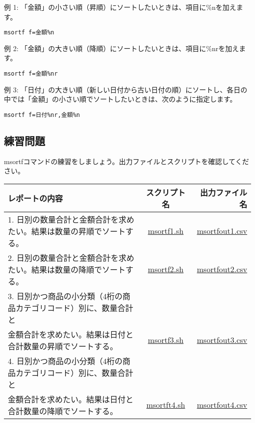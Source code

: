 例 1: 「金額」の小さい順（昇順）にソートしたいときは、項目に\%nを加えます。
\begin{verbatim}
msortf f=金額%n
\end{verbatim}

例 2: 「金額」の大きい順（降順）にソートしたいときは、項目に\%nrを加えます。
\begin{verbatim}
msortf f=金額%nr
\end{verbatim}

例 3: 「日付」の大きい順（新しい日付から古い日付の順）にソートし、各日の中では「金額」の小さい順でソートしたいときは、次のように指定します。
\begin{verbatim}
msortf f=日付%nr,金額%n
\end{verbatim}

\newpage

\subsection{練習問題}

msortfコマンドの練習をしましょう。出力ファイルとスクリプトを確認してください。

\begin{table}[htbp]
{\small
\begin{tabular}{ l | c || r }
\hline
\textbf{レポートの内容}   & \textbf{スクリプト名} & \textbf{出力ファイル名}  \\
\hline
1. 日別の数量合計と金額合計を求めたい。結果は数量の昇順でソートする。  & \href{exercise/msortf1.sh}{msortf1.sh} & \href{exercise/outdat/msortfout1.csv}{msortfout1.csv} \\
2. 日別の数量合計と金額合計を求めたい。結果は数量の降順でソートする。  & \href{exercise/msortf2.sh}{msortf2.sh} & \href{exercise/outdat/msortfout2.csv}{msortfout2.csv} \\
3. 日別かつ商品の小分類（4桁の商品カテゴリコード）別に、数量合計と\\金額合計を求めたい。結果は日付と合計数量の昇順でソートする。& \href{exercise/msortf3.sh}{msortf3.sh} & \href{exercise/outdat/msortfout3.csv}{msortfout3.csv} \\
4. 日別かつ商品の小分類（4桁の商品カテゴリコード）別に、数量合計と\\金額合計を求めたい。結果は日付と合計数量の降順でソートする。 & \href{exercise/msortf4.sh}{msortft4.sh} & \href{exercise/outdat/msortfout4.csv}{msortfout4.csv} \\

\hline
\end{tabular} 
}
\end{table} 


%
